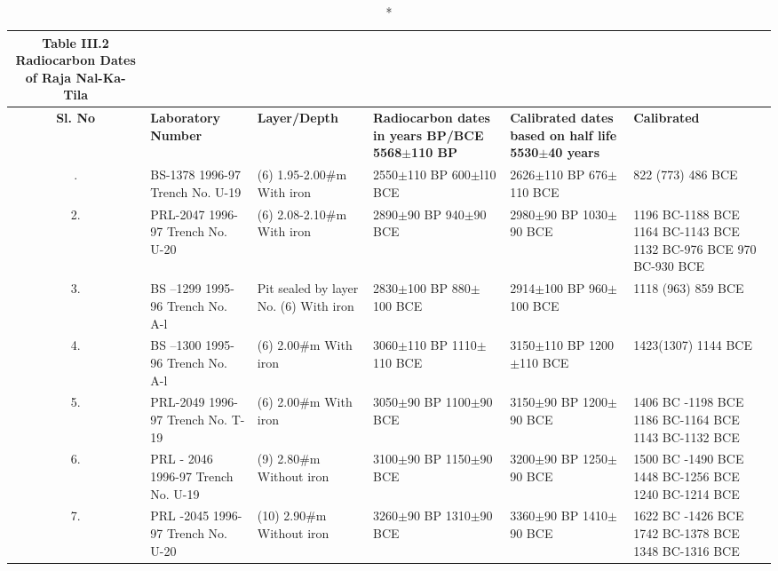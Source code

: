 {\setlength\tabcolsep{2pt}
{\fontsize{7}{9}\selectfont
\begin{longtable}{|c|p{1.8cm}|p{1.5cm}|p{1.5cm}|p{1.5cm}|p{1.8cm}|}
\caption*{Table III.2 Radiocarbon Dates of Raja Nal-Ka-Tila}\label{table III.2}\\
\hline
\multicolumn{1}{|m{.5cm}|}{\textbf{Sl. No}} &\multicolumn{1}{m{1.8cm}|}{\centering \textbf{Laboratory Number}}&\multicolumn{1}{m{1.5cm}|}{\centering \textbf{Layer/Depth}}&\multicolumn{1}{m{1.5cm}|}{\centering \textbf{Radiocarbon dates in years BP/BCE 5568$\pm$110 BP}}&\multicolumn{1}{m{1.5cm}|}{\centering \textbf{Calibrated dates based on half life 5530$\pm$40 years}} & \multicolumn{1}{m{1.8cm}|}{\centering \textbf{Calibrated}}\\
\endfirsthead
\hline
\endhead
\hline
\endfoot
\hline
1. & BS-1378 1996-97 Trench No. U-19 & (6) 1.95-2.00$\#$m With iron & 2550$\pm$110 BP 600$\pm$l10 BCE & 2626$\pm$110 BP 676$\pm$110 BCE & 822 (773) 486 BCE\\
2. & PRL-2047 1996-97 Trench No. U-20 & (6) 2.08-2.10$\#$m With iron & 2890$\pm$90 BP 940$\pm$90 BCE & 2980$\pm$90 BP 1030$\pm$90 BCE & 1196 BC-1188 BCE 1164 BC-1143 BCE 1132 BC-976 BCE 970 BC-930 BCE\\
3. & BS –1299 1995-96 Trench No. A-l & Pit sealed by layer No. (6) With iron & 2830$\pm$100 BP 880$\pm$100 BCE & 2914$\pm$100 BP 960$\pm$100 BCE & 1118 (963) 859 BCE\\
4. & BS –1300 1995-96 Trench No. A-l & (6) 2.00\#m With iron & 3060$\pm$110 BP 1110$\pm$110 BCE & 3150$\pm$110 BP 1200$\pm$110 BCE & 1423(1307) 1144 BCE\\
5. & PRL-2049 1996-97 Trench No. T-19 & (6) 2.00\#m With iron & 3050$\pm$90 BP 1100$\pm$90 BCE & 3150$\pm$90 BP 1200$\pm$90 BCE & 1406 BC -1198 BCE 1186 BC-1164 BCE 1143 BC-1132 BCE\\
6. & PRL - 2046 1996-97 Trench No. U-19 & (9) 2.80\#m Without iron & 3100$\pm$90 BP 1150$\pm$90 BCE & 3200$\pm$90 BP 1250$\pm$90 BCE & 1500 BC -1490 BCE 1448 BC-1256 BCE 1240 BC-1214 BCE\\
7. & PRL -2045 1996-97 Trench No. U-20 & (10) 2.90\#m Without iron & 3260$\pm$90 BP 1310$\pm$90 BCE & 3360$\pm$90 BP 1410$\pm$90 BCE & 1622 BC -1426 BCE 1742 BC-1378 BCE 1348 BC-1316 BCE\\
\end{longtable}
}}


